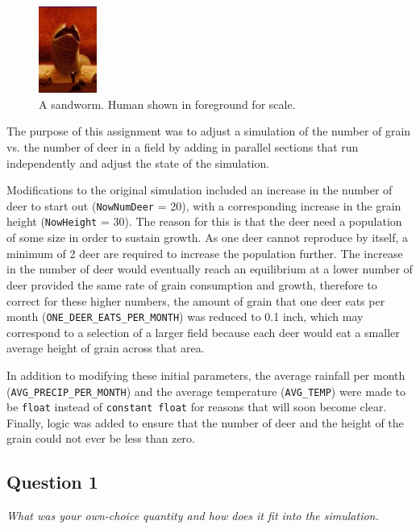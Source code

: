 \documentclass{article}
\begin{document}
\begin{figure}
        \begin{center}
        \includegraphics[width=0.17\textwidth]{Sandworm_heretics.jpg}
        \end{center}
        \caption{A sandworm.  Human shown in foreground for scale.}
        \label{fig:Sandworm}
\end{figure}
The purpose of this assignment was to adjust a simulation of the number of grain vs. the number of deer in a field by adding in parallel sections that run independently and adjust the state of the simulation.

Modifications to the original simulation included an increase in the number of deer to start out (\texttt{NowNumDeer} = 20), with a corresponding increase in the grain height (\texttt{NowHeight} = 30).  The reason for this is that the deer need a population of some size in order to sustain growth.  As one deer cannot reproduce by itself, a minimum of 2 deer are required to increase the population further.  The increase in the number of deer would eventually reach an equilibrium at a lower number of deer provided the same rate of grain consumption and growth, therefore to correct for these higher numbers, the amount of grain that one deer eats per month (\texttt{ONE\_DEER\_EATS\_PER\_MONTH}) was reduced to 0.1 inch, which may correspond to a selection of a larger field because each deer would eat a smaller average height of grain across that area.

In addition to modifying these initial parameters, the average rainfall per month (\texttt{AVG\_PRECIP\_PER\_MONTH}) and the average temperature (\texttt{AVG\_TEMP}) were made to be \texttt{float} instead of \texttt{constant float} for reasons that will soon become clear.  Finally, logic was added to ensure that the number of deer and the height of the grain could not ever be less than zero.

\subsection*{Question 1}
\textit{What was your own-choice quantity and how does it fit into the simulation.}
\end{document}

